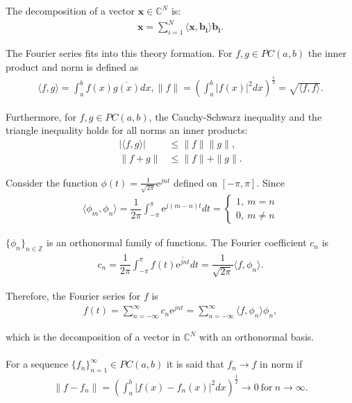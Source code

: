The decomposition of a vector $\textbf{x} \in \mathbb{C}^N$ is:
\begin{align*}
\textbf{x} = \sum_{i=1}^N \langle \textbf{x}, \textbf{b}_\textbf{i} \rangle \textbf{b}_\textbf{i}.
\end{align*}

The Fourier series fits into this theory formation. For
$f,g \in PC(a,b)$ the inner product and norm is defined as
\begin{align*}
\langle f,g \rangle = \int_a^b f(x) \overline{g(x)} dx,
\|f\| = \left( \int_a^b |f(x)|^2 dx \right)^{\frac{1}{2}} = \sqrt{\langle f,f \rangle}.
\end{align*}

Furthermore, for $f,g \in PC(a,b)$, the Cauchy-Schwarz inequality and the triangle inequality holds for all norms an inner products:
\begin{align*}
|\langle f,g \rangle| &\leq \|f\| \|g\|, \\
\|f+g\| &\leq \|f\| + \|g\|.
\end{align*}

Consider the function $\phi(t) = \frac{1}{\sqrt{2\pi}} \text{e}^{jnt}$ defined on $[-\pi,\pi]$. Since
\begin{align*}
\langle \phi_m, \phi_n \rangle = \dfrac{1}{2\pi} \int_{-\pi}^\pi \text{e}^{j(m-n)t} dt =
\begin{cases}
1, \ m = n \\
0, \ m \neq n
\end{cases}
\end{align*}

$\{\phi_n\}_{n\in\mathbb{Z}}$ is an orthonormal family of functions. The Fourier coefficient $c_n$ is
\begin{align*}
c_n = \dfrac{1}{2\pi} \int_{-\pi}^\pi f(t) \overline{\text{e}^{jnt}} dt = \dfrac{1}{\sqrt{2\pi}} \langle f,\phi_n \rangle.
\end{align*}

Therefore, the Fourier series for $f$ is
\begin{align} \label{eq:ort_fam}
f(t) = \sum_{n=-\infty}^\infty c_n \text{e}^{jnt} = \sum_{n=-\infty}^\infty \langle f, \phi_n \rangle \phi_n,
\end{align}

which is the decomposition of a vector in $\mathbb{C}^N$ with an orthonormal basis.
\\ \\
For a sequence $\{f_n\}_{n=1}^\infty \in PC(a,b)$ it is said that $f_n \to f$ in norm if
\begin{align*}
\|f - f_n\| = \left( \int_a^b |f(x) - f_n(x)|^2  dx \right)^\frac{1}{2} \to 0 \ \text{for} \ n \to \infty.
\end{align*}

